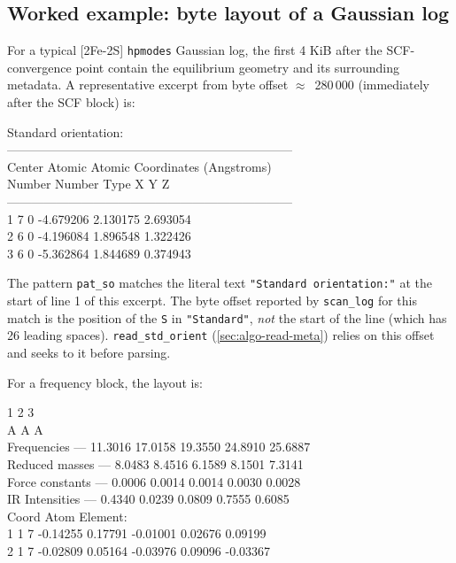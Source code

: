 \documentclass[10pt,a4paper,twoside]{article}
\newcommand{\fn}[1]{\texttt{#1}}
\begin{document}
\subsection{Worked example: byte layout of a Gaussian log}

For a typical [2Fe-2S] \fn{hpmodes} Gaussian log, the first 4 KiB
after the SCF-convergence point contain the equilibrium geometry
and its surrounding metadata. A representative excerpt from byte
offset $\approx$~280\,000 (immediately after the SCF block) is:

\begin{bytebox}
                          Standard orientation:                         \\
 ---------------------------------------------------------------------\\
 Center     Atomic      Atomic             Coordinates (Angstroms)\\
 Number     Number       Type             X           Y           Z\\
 ---------------------------------------------------------------------\\
      1          7           0       -4.679206    2.130175    2.693054\\
      2          6           0       -4.196084    1.896548    1.322426\\
      3          6           0       -5.362864    1.844689    0.374943\\
\end{bytebox}

The pattern \texttt{pat\_so} matches the literal text
\texttt{"Standard orientation:"} at the start of line 1 of this
excerpt. The byte offset reported by \fn{scan\_log} for this
match is the position of the \texttt{S} in
\texttt{"Standard"}, \emph{not} the start of the line (which has
26 leading spaces). \fn{read\_std\_orient} (\cref{sec:algo-read-meta})
relies on this offset and seeks to it before parsing.

For a frequency block, the layout is:

\begin{bytebox}
                     1                      2                      3  \\
                     A                      A                      A  \\
       Frequencies ---    11.3016   17.0158   19.3550   24.8910   25.6887\\
    Reduced masses ---     8.0483    8.4516    6.1589    8.1501    7.3141\\
   Force constants ---     0.0006    0.0014    0.0014    0.0030    0.0028\\
    IR Intensities ---     0.4340    0.0239    0.0809    0.7555    0.6085\\
 Coord Atom Element:\\
   1     1     7         -0.14255   0.17791  -0.01001   0.02676   0.09199\\
   2     1     7         -0.02809   0.05164  -0.03976   0.09096  -0.03367\\
\end{bytebox}
\end{document}
